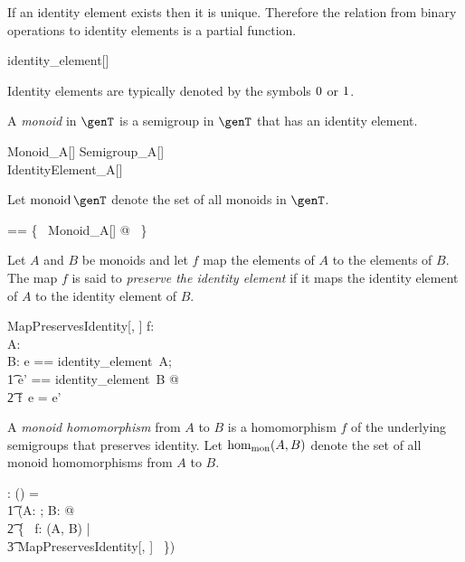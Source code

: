 \documentclass{amsart}
\begin{document}
\begin{remark}
If an identity element exists then it is unique.
Therefore the relation from binary operations to identity elements is a partial function.

\begin{zed}
identity\_element[\setT] \in \binop \setT \pfun \setT
\end{zed}

\end{remark}

Identity elements are typically denoted by the symbols  $0$ or $1$.

A {\em monoid} in $\genT$ is a semigroup in $\genT$ that has an identity element.
\begin{schema}{Monoid\_A}[\genT]
	Semigroup\_A[\genT] \\
	IdentityElement\_A[\genT]
\end{schema}

Let $\monoid \genT$ denote the set of all monoids in $\genT$.
\begin{zed}
	\monoid \genT == \{~ Monoid\_A[\genT] @ \strucA ~\}
\end{zed}


Let $A$ and $B$ be monoids and let $f$ map the elements of $A$ to the elements of $B$.
The map $f$ is said to {\em preserve the identity element} if it maps the identity element of $A$
to the identity element of $B$.
\begin{schema}{MapPreservesIdentity}[\genT, \genU]
	f: \genT \pfun \genU \\
	A: \monoid \genT \\
	B: \monoid \genU
\where
\LET e == identity\_element~A; \\
\t1	e' == identity\_element~B @ \\
\t2		f~e = e'
\end{schema}

A {\em monoid homomorphism} from $A$ to $B$ is a homomorphism $f$ of the underlying semigroups
that preserves identity.
Let $\operatorname{hom_{mon}}(A, B)$ denote the set of all monoid homomorphisms from $A$ to $B$.
\begin{gendef}[\genT, \genU]
	\homMonoid: \monoid \genT \cross \monoid \genU \fun \power (\genT \fun \genU)
\where
	\homMonoid = \\
	\t1	(\lambda A: \monoid \genT; B: \monoid \genU @ \\
	\t2		\{~ f: \homSemigroup(A, B) | \\
	\t3			MapPreservesIdentity[\genT, \genU] ~\})
\end{gendef}
\end{document}
